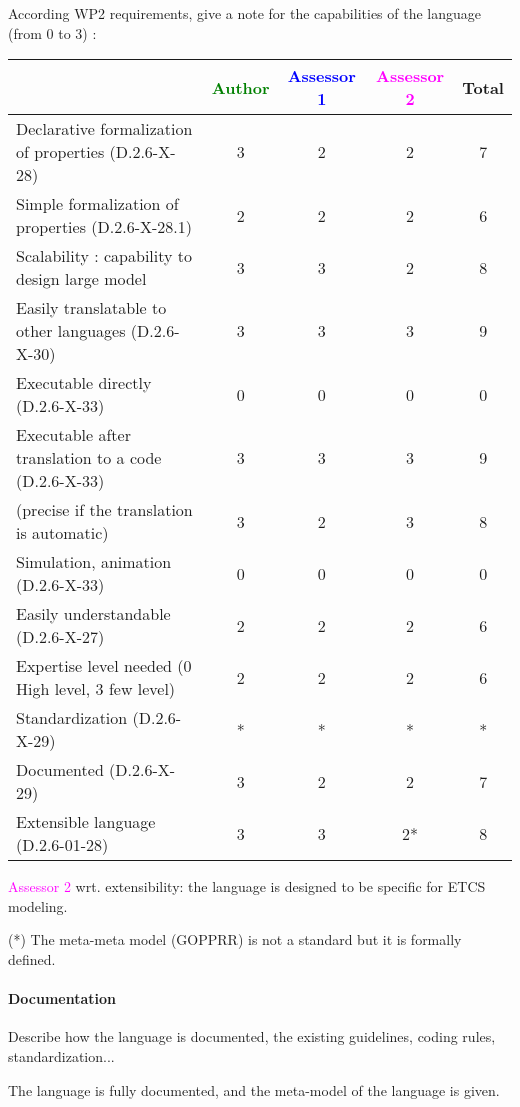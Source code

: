 According WP2 requirements, give a note for the capabilities of the language (from 0 to 3) :

\begin{tabular}{|l | c | c | c | c|}
  \hline
  & \textcolor{green}{Author} & \textcolor{blue}{Assessor 1} & \textcolor{magenta}{Assessor 2} & Total \\
  \hline
  Declarative formalization of properties (D.2.6-X-28) &3 &2 & 2& 7 \\
  \hline
  Simple formalization of properties (D.2.6-X-28.1) &2 &2 & 2& 6 \\
  \hline
  Scalability : capability to design large model &3 &3 & 2& 8 \\
  \hline
  Easily translatable to other languages (D.2.6-X-30) &3 &3 & 3& 9 \\
  \hline
  Executable directly (D.2.6-X-33) &0 &0 & 0& 0 \\
  \hline
  Executable after translation to a code (D.2.6-X-33) &3 &3 & 3& 9 \\
  (precise if the translation is automatic) &3 &2 & 3& 8 \\
  \hline
  Simulation, animation (D.2.6-X-33) &0 &0 & 0& 0 \\
  \hline
  Easily understandable (D.2.6-X-27) &2 &2 & 2& 6 \\
  \hline
  Expertise level needed (0 High level, 3 few level) &2 &2 & 2& 6 \\
  \hline
  Standardization (D.2.6-X-29) &* &* & *& * \\
  \hline
  Documented (D.2.6-X-29) &3 &2 & 2& 7 \\
  \hline
  Extensible language (D.2.6-01-28) &3 &3 & 2*& 8\\
  \hline
\end{tabular}

\textcolor{magenta}{Assessor 2} wrt. extensibility: the language is designed to
be specific for ETCS modeling.

\begin{author_comment}
(*) The meta-meta model (GOPPRR) is not a standard but it is formally defined.
\end{author_comment}

\paragraph{Documentation} Describe how the language is documented, the existing guidelines, coding rules, standardization...

The language is fully documented, and the meta-model of the language
is given.
